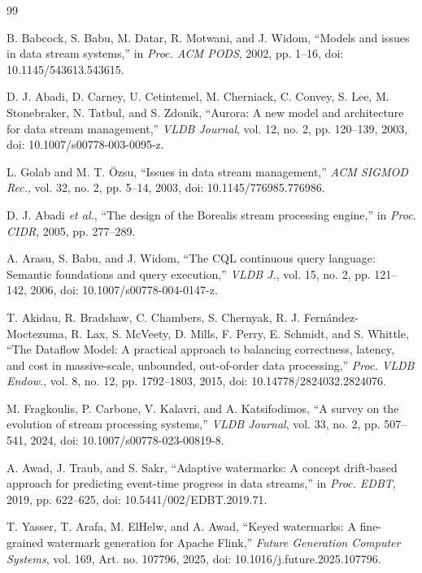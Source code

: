 \documentclass[conference]{IEEEtran}
\begin{document}
\balance
\begin{thebibliography}{99}

B. Babcock, S. Babu, M. Datar, R. Motwani, and J. Widom,
``Models and issues in data stream systems,'' in \emph{Proc. ACM PODS}, 2002, pp. 1--16, doi: 10.1145/543613.543615.

D. J. Abadi, D. Carney, U. Cetintemel, M. Cherniack, C. Convey, S. Lee, M. Stonebraker, N. Tatbul, and S. Zdonik,
``Aurora: A new model and architecture for data stream management,'' \emph{VLDB Journal}, vol. 12, no. 2, pp. 120--139, 2003, doi: 10.1007/s00778-003-0095-z.

L. Golab and M. T. {\"O}zsu, ``Issues in data stream management,'' \emph{ACM SIGMOD Rec.}, vol. 32, no. 2, pp. 5--14, 2003, doi: 10.1145/776985.776986.

D. J. Abadi \emph{et al.}, ``The design of the Borealis stream processing engine,'' in \emph{Proc. CIDR}, 2005, pp. 277--289.

A. Arasu, S. Babu, and J. Widom, ``The CQL continuous query language: Semantic foundations and query execution,'' \emph{VLDB J.}, vol. 15, no. 2, pp. 121--142, 2006, doi: 10.1007/s00778-004-0147-z.

T. Akidau, R. Bradshaw, C. Chambers, S. Chernyak, R. J. Fern\'andez-Moctezuma, R. Lax, S. McVeety, D. Mills, F. Perry, E. Schmidt, and S. Whittle,
``The Dataflow Model: A practical approach to balancing correctness, latency, and cost in massive-scale, unbounded, out-of-order data processing,'' \emph{Proc. VLDB Endow.}, vol. 8, no. 12, pp. 1792--1803, 2015, doi: 10.14778/2824032.2824076.

M. Fragkoulis, P. Carbone, V. Kalavri, and A. Katsifodimos,
``A survey on the evolution of stream processing systems,'' \emph{VLDB Journal}, vol. 33, no. 2, pp. 507--541, 2024, doi: 10.1007/s00778-023-00819-8.

A. Awad, J. Traub, and S. Sakr,
``Adaptive watermarks: A concept drift-based approach for predicting event-time progress in data streams,'' in \emph{Proc. EDBT}, 2019, pp. 622--625, doi: 10.5441/002/EDBT.2019.71.

T. Yasser, T. Arafa, M. ElHelw, and A. Awad,
``Keyed watermarks: A fine-grained watermark generation for Apache Flink,'' \emph{Future Generation Computer Systems}, vol. 169, Art. no. 107796, 2025, doi: 10.1016/j.future.2025.107796.


\end{thebibliography}
\end{document}
